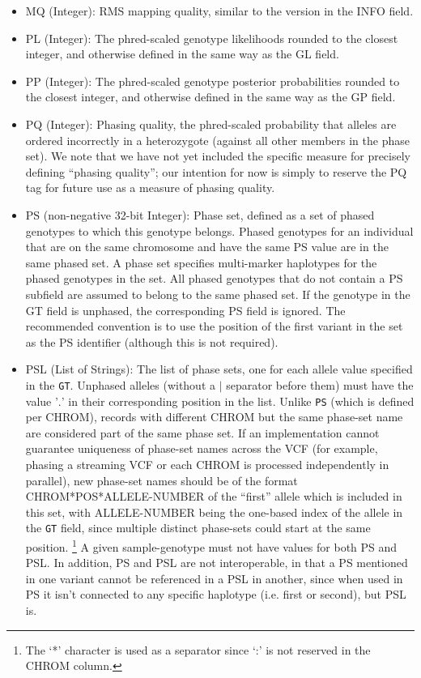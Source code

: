 \documentclass[8pt]{article}
\begin{document}
\begin{itemize}
  \item MQ (Integer): RMS mapping quality, similar to the version in the INFO field.
  \item PL (Integer): The phred-scaled genotype likelihoods rounded to the closest integer, and otherwise defined in the same way as the GL field.
  \item PP (Integer): The phred-scaled genotype posterior probabilities rounded to the closest integer, and otherwise defined in the same way as the GP field.
  \item PQ (Integer): Phasing quality, the phred-scaled probability that alleles are ordered incorrectly in a heterozygote (against all other members in the phase set).
  We note that we have not yet included the specific measure for precisely defining ``phasing quality''; our intention for now is simply to reserve the PQ tag for future use as a measure of phasing quality.
  \item PS (non-negative 32-bit Integer): Phase set, defined as a set of phased genotypes to which this genotype belongs.
  Phased genotypes for an individual that are on the same chromosome and have the same PS value are in the same phased set.
  A phase set specifies multi-marker haplotypes for the phased genotypes in the set.
  All phased genotypes that do not contain a PS subfield are assumed to belong to the same phased set.
  If the genotype in the GT field is unphased, the corresponding PS field is ignored.
  The recommended convention is to use the position of the first variant in the set as the PS identifier (although this is not required).
  \item PSL (List of Strings): The list of phase sets, one for each allele value specified in the {\tt GT}. 
  Unphased alleles (without a $\mid$ separator before them) must have the value '$.$' in their corresponding position in the list.
  Unlike {\tt PS} (which is defined per CHROM), records with different CHROM but the same phase-set name are considered part of the same phase set.
  If an implementation cannot guarantee uniqueness of phase-set names across the VCF (for example, phasing a streaming VCF or each CHROM is processed independently in parallel), new phase-set names should be of the format CHROM*POS*ALLELE-NUMBER of the ``first'' allele which is included in this set, with ALLELE-NUMBER being the one-based index of the allele in the {\tt GT} field, since multiple distinct phase-sets could start at the same position. \footnote{The `*' character is used as a separator since `:' is not reserved in the CHROM column.}
  A given sample-genotype must not have values for both PS and PSL.
  In addition, PS and PSL are not interoperable, in that a PS mentioned in one variant cannot be referenced in a PSL in another,  since when used in PS it isn't connected to any specific haplotype (i.e. first or second), but PSL is. 
 

\end{itemize}
\end{document}
